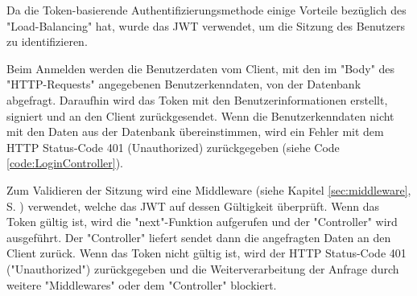 
Da die Token-basierende Authentifizierungsmethode einige Vorteile bezüglich des "Load-Balancing" hat, wurde das JWT verwendet, um die Sitzung des Benutzers zu identifizieren.



Beim Anmelden werden die Benutzerdaten vom Client, mit den im "Body" des "HTTP-Requests" angegebenen Benutzerkenndaten, von der Datenbank abgefragt. 
Daraufhin wird das Token mit den Benutzerinformationen erstellt, signiert und an den Client zurückgesendet. 
Wenn die Benutzerkenndaten nicht mit den Daten aus der Datenbank übereinstimmen, wird ein Fehler mit dem HTTP Status-Code 401 (Unauthorized) zurückgegeben (siehe Code \ref{code:LoginController}).


\pagebreak
{}

Zum Validieren der Sitzung wird eine Middleware (siehe Kapitel \ref{sec:middleware}, S. \pageref{sec:middleware}) verwendet, welche das JWT auf dessen Gültigkeit überprüft. 
Wenn das Token gültig ist, wird die "next"-Funktion aufgerufen und der "Controller" wird ausgeführt. Der "Controller" liefert sendet dann die angefragten Daten an den Client zurück. 
Wenn das Token nicht gültig ist, wird der HTTP Status-Code 401 ("Unauthorized") zurückgegeben und die Weiterverarbeitung der Anfrage durch weitere "Middlewares" oder dem "Controller" blockiert.

